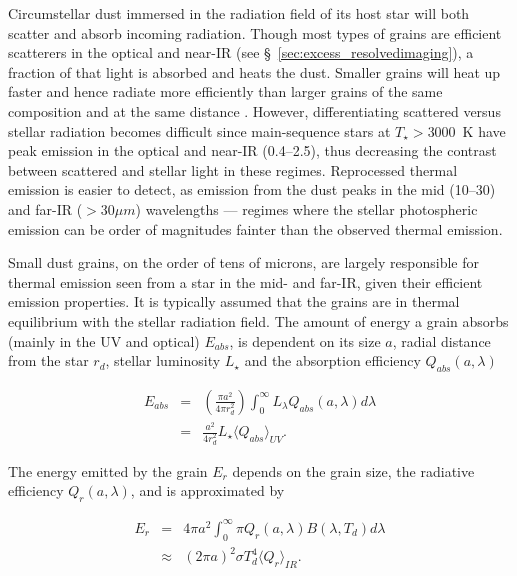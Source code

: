     Circumstellar dust immersed in the radiation field of its host star will both scatter and absorb incoming radiation. Though most types of grains are efficient scatterers in the optical and near-IR (see \S~\ref{sec:excess_resolvedimaging}), a fraction of that light is absorbed and heats the dust. Smaller grains will heat up faster and hence radiate more efficiently than larger grains of the same composition and at the same distance \citep{Krivov2010}. However, differentiating scattered versus stellar radiation becomes difficult since main-sequence stars at $T_\star>3000$~K have peak emission in the optical and near-IR (0.4--2.5\micron), thus decreasing the contrast between scattered and stellar light in these regimes. Reprocessed thermal emission is easier to detect, as emission from the dust peaks in the mid (10--30\micron) and far-IR ($>30\mu m$) wavelengths --- regimes where the stellar photospheric emission can be order of magnitudes fainter than the observed thermal emission.  
        

    Small dust grains, on the order of tens of microns, are largely responsible for thermal emission seen from a star in the mid- and far-IR, given their efficient emission properties. It is typically assumed that the grains are in thermal equilibrium with the stellar radiation field. The amount of energy a grain absorbs (mainly in the UV and optical) $E_{abs}$, is dependent on its size $a$, radial distance from the star $r_d$, stellar luminosity $L_\star$ and the absorption efficiency $Q_{abs}(a,\lambda)$
    
    \begin{eqnarray}\label{eq:energy_absorbed}
    E_{abs} &=& \left(\frac{\pi a^2}{4\pi r_d^2}\right) \int_0^\infty L_{\lambda} Q_{abs}(a,\lambda) d\lambda \\
            &=&  \frac{a^2}{4r_d^2}L_\star \langle Q_{abs}\rangle_{UV}. 
    \end{eqnarray}
    
    \noindent The energy emitted by the grain $E_{r}$ depends on the grain size, the radiative efficiency $Q_{r}(a,\lambda)$, and is approximated by
    
    \begin{eqnarray}
    E_{r} &=& 4\pi a^2 \int_0^\infty \pi Q_{r}(a,\lambda) B(\lambda,T_d)  d\lambda \label{eq:energy_emitted1}\\
          & \approx & \left(2\pi a\right)^2 \sigma T_d^4 \langle Q_{r}\rangle_{IR}. \label{eq:energy_emitted2}
    \end{eqnarray}
            
